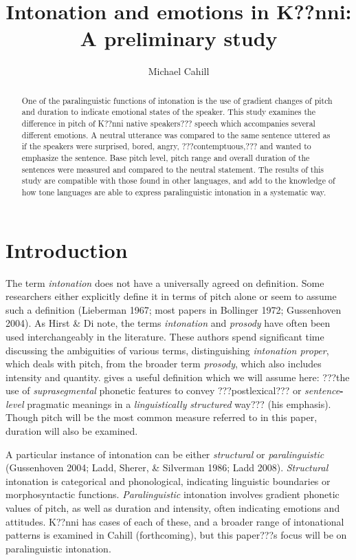 \documentclass[output=paper]{langsci/langscibook}
\title{Intonation and emotions in {K??nni}: {A} preliminary study}
\author{%
 Michael Cahill\affiliation{Cahill affiliation} 
}
\begin{document}
\begin{abstract}
One of the paralinguistic functions of intonation is the use of gradient changes of pitch and duration to indicate emotional states of the speaker. This study examines the difference in pitch of K??nni native speakers??? speech which accompanies several different emotions. A neutral utterance was compared to the same sentence uttered as if the speakers were surprised, bored, angry, ???contemptuous,??? and wanted to emphasize the sentence. Base pitch level, pitch range and overall duration of the sentences were measured and compared to the neutral statement. The results of this study are compatible with those found in other languages, and add to the knowledge of how tone languages are able to express paralinguistic intonation in a systematic way.
\end{abstract}

\section{Introduction}

The term \emph{intonation} does not have a universally agreed on definition. Some researchers either explicitly define it in terms of pitch alone or seem to assume such a definition (Lieberman 1967; most papers in Bollinger 1972; Gussenhoven 2004). As Hirst \& Di\citet[3]{Canio1998} note, the terms \emph{intonation} and \emph{prosody} have often been used interchangeably in the literature. These authors spend significant time discussing the ambiguities of various terms, distinguishing \emph{intonation proper}, which deals with pitch, from the broader term \emph{prosody},\emph{ }which also includes intensity and quantity. \citet[4]{Ladd2008} gives a useful definition which we will assume here: ???the use of \emph{suprasegmental} phonetic features to convey ???postlexical??? or \emph{sentence}\textbf{{}-}\emph{level}\textbf{ }pragmatic meanings in a \emph{linguistically}\textbf{ }\emph{structured}\textbf{ }way??? (his emphasis). Though pitch will be the most common measure referred to in this paper, duration will also be examined. 


A particular instance of intonation can be either \emph{structural} or \emph{paralinguistic} (Gussenhoven 2004; Ladd, Sherer, \& Silverman 1986; Ladd 2008). \emph{Structural} intonation is categorical and phonological, indicating linguistic boundaries or morphosyntactic functions. \emph{Paralinguistic} intonation involves gradient phonetic values of pitch, as well as duration and intensity, often indicating emotions and attitudes. K??nni has cases of each of these, and a broader range of intonational patterns is examined in Cahill (forthcoming), but this paper???s focus will be on paralinguistic intonation.
\end{document}
